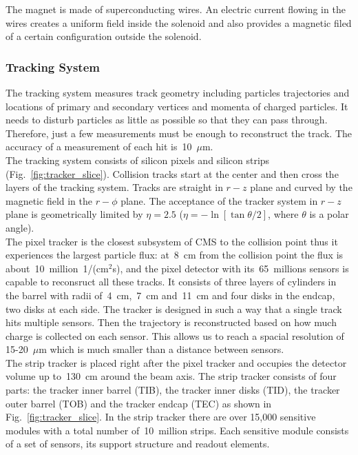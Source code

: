 The magnet is made of superconducting wires. An electric current flowing in the wires creates a uniform field inside the solenoid and also provides a magnetic filed of a certain configuration outside the solenoid.\\

\subsubsection{Tracking System}

The tracking system measures track geometry including particles trajectories and locations of primary and secondary vertices and momenta of charged particles. It needs to disturb particles as little as possible so that they can pass through. Therefore, just a few measurements must be enough to reconstruct the track. The accuracy of a measurement of each hit is~10~$\mu$m.\\

The tracking system consists of silicon pixels and silicon strips (Fig.~\ref{fig:tracker_slice}). Collision tracks start at the center and then cross the layers of the tracking system. Tracks are straight in $r-z$ plane and curved by the magnetic field in the $r-\phi$ plane. The acceptance of the tracker system in $r-z$ plane is geometrically limited by $\eta=2.5$ ($\eta=-\ln[ {\tan{\theta/2}}]$, where $\theta$ is a polar angle).\\

The pixel tracker is the closest subsystem of CMS to the collision point thus it experiences the largest particle flux: at~8~cm from the collision point the flux is about~10~million~1/(cm$^2$s), and the pixel detector with its~65~millions sensors is capable to reconsruct all these tracks. It consists of three layers of cylinders in the barrel with radii of~4~cm,~7~cm and~11~cm and four disks in the endcap, two disks at each side. The tracker is designed in such a way that a single track hits multiple sensors. Then the trajectory is reconstructed based on how much charge is collected on each sensor. This allows us to reach a spacial resolution of 15-20~$\mu$m which is much smaller than a distance between sensors.\\

The strip tracker is placed right after the pixel tracker and occupies the detector volume up to~130~cm around the beam axis. The strip tracker consists of four parts: the tracker inner barrel (TIB), the tracker inner disks (TID), the tracker outer barrel (TOB) and the tracker endcap (TEC) as shown in Fig.~\ref{fig:tracker_slice}. In the strip tracker there are over 15,000 sensitive modules with a total number of~10~million strips. Each sensitive module consists of a set of sensors, its support structure and readout elements.\\

